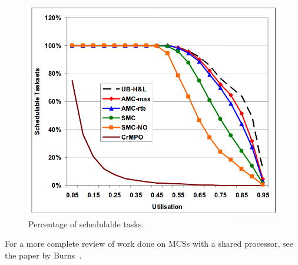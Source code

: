
\begin{figure}[H]
\centering
\includegraphics[width=\textwidth]{./img/literature_schedulers.png}
\caption{Percentage of schedulable tasks.~\cite{baruah2011}}\label{fig:schedulers}
\end{figure}

For a more complete review of work done on MCSs with a shared processor, see the paper by Burns~\cite{burns2016}.



